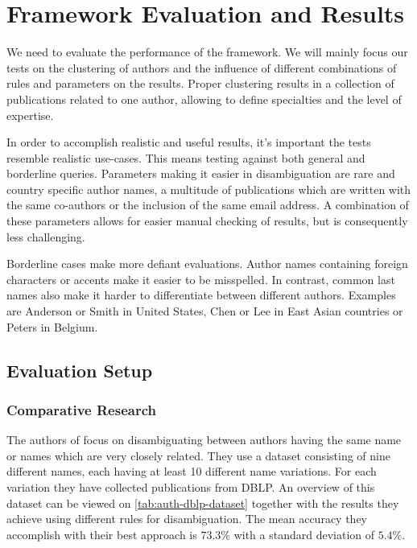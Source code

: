\chapter{Framework Evaluation and Results}
\label{results}


We need to evaluate the performance of the framework. We will mainly focus our tests on the clustering of authors and the influence of different combinations of rules and parameters on the results. Proper clustering results in a collection of publications related to one author, allowing to define specialties and the level of expertise. 

In order to accomplish realistic and useful results, it's important the tests resemble realistic use-cases. This means testing against both general and borderline queries. Parameters making it easier in disambiguation are rare and country specific author names, a multitude of publications which are written with the same co-authors or the inclusion of the same email address. A combination of these parameters allows for easier manual checking of results, but is consequently less challenging. 

Borderline cases make more defiant evaluations. Author names containing foreign characters or accents make it easier to be misspelled. In contrast, common last names also make it harder to differentiate between different authors. Examples are Anderson or Smith in United States, Chen or Lee in East Asian countries or Peters in Belgium.




\section{Evaluation Setup}

\subsection{Comparative Research}

The authors of \cite{han2004two} focus on disambiguating between authors having the same name or names which are very closely related. They use a dataset consisting of nine different names, each having at least 10 different name variations. For each variation they have collected publications from DBLP. An overview of this dataset can be viewed on \autoref{tab:auth-dblp-dataset} together with the results they achieve using different rules for disambiguation. The mean accuracy they accomplish with their best approach is $73.3\%$ with a standard deviation of $5.4\%$.

